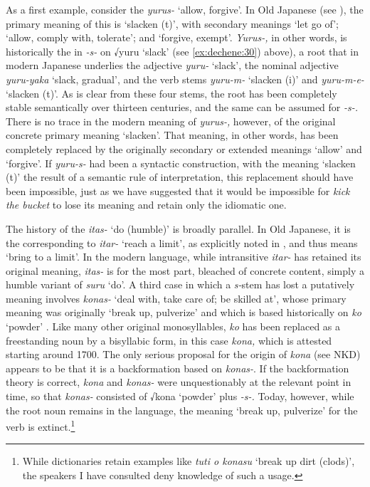 \documentclass[output=paper,
modfonts
]{LSP/langsci}
\begin{document}
\newpage 
As a first example, consider the  \textit{yurus-} `allow, forgive'. In
Old Japanese (see \citealt{omodaka1967a}), the primary meaning of this 
is `slacken (t)', with secondary meanings `let go of'; `allow, comply
with, tolerate'; and `forgive, exempt'. \textit{Yurus-,} in other words,
is historically the  in \textit{-s-} on √yuru `slack' (see \ref{ex:dechene:30})
above), a root that in modern Japanese underlies the adjective 
\textit{yuru-} `slack', the nominal adjective \textit{yuru-yaka} `slack,
gradual', and the verb stems \textit{yuru-m-} `slacken (i)' and
\textit{yuru-m-e-} `slacken (t)'. As is clear from these four stems, the
root has been completely stable semantically over thirteen centuries,
and the same can be assumed for  \textit{-s-.} There is no trace
in the modern meaning of \textit{yurus-,} however, of the original
concrete primary meaning `slacken'. That meaning, in other words, has
been completely replaced by the originally secondary or extended
meanings `allow' and `forgive'. If \textit{yuru-s-} had been a syntactic
construction, with the meaning `slacken (t)' the  result of
a semantic rule of interpretation, this replacement should have been
impossible, just as we have suggested that it would be impossible for
\textit{kick the bucket} to lose its  meaning and retain only
the idiomatic one.

The history of the  \textit{itas-} `do (humble)' is broadly parallel.
In Old Japanese, it is the  corresponding to \textit{itar-}
`reach a limit', as explicitly noted in \citet{omodaka1967a}, and thus
means `bring to a limit'. In the modern language, while intransitive
\textit{itar-} has retained its original meaning, \textit{itas-} is for the
most part, bleached of concrete content, simply a  humble
variant of \textit{suru} `do'. A third case in which a \textit{s-}stem has
lost a putatively   meaning involves \textit{konas-}
`deal with, take care of; be skilled at', whose primary meaning was
originally `break up, pulverize' and which is based historically on
\textit{ko} `powder' \citep{ono1974a}. Like many other original monosyllables,
\textit{ko} has been replaced as a freestanding noun by a bisyllabic form,
in this case \textit{kona,} which is attested starting around 1700. The
only serious proposal for the origin of \textit{kona} (see NKD) appears to
be that it is a backformation based on \textit{konas-}. If the
backformation theory is correct, \textit{kona} and \textit{konas-} were
unquestionably  at the relevant point in time, so that
\textit{konas-} consisted of √kona `powder' plus  \textit{-s-.}
Today, however, while the root noun remains in the language, the meaning
`break up, pulverize' for the verb is extinct.\footnote{While
  dictionaries retain examples like \textit{tuti o konasu} `break up dirt
  (clods)', the speakers I have consulted deny knowledge of such a
  usage.}
\end{document}
